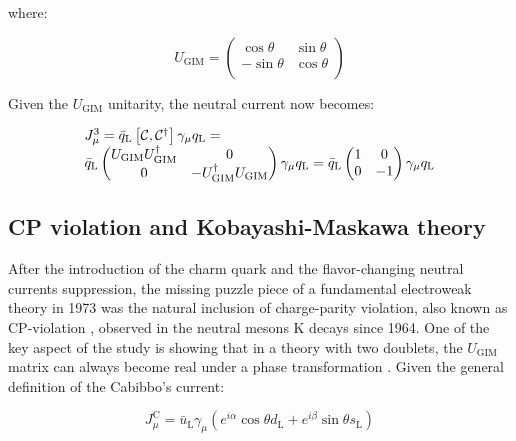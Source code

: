 where:

\begin{equation}
U_{\text{GIM}} =
\begin{pmatrix}
\cos\theta &\sin\theta \\
-\sin\theta &\cos\theta \\
\end{pmatrix}
\end{equation}

Given the $U_{\text{GIM}}$ unitarity, the neutral current now becomes:

\begin{equation}
	\begin{array}{l c l}
		J^{3}_{\mu} = \bar{q}_{\text{L}}\left[\mathcal{C}, \mathcal{C}^{\dagger} \right]\gamma_{\mu}q_{\text{L}} = \\
		\bar{q}_{\text{L}}
		\begin{pmatrix}
			U_{\text{GIM}}U_{\text{GIM}}^{\dagger} &0 \\
			0 &-U_{\text{GIM}}^{\dagger}U_{\text{GIM}} \\
		\end{pmatrix}
		\gamma_{\mu}q_{\text{L}} = \bar{q}_{\text{L}}
		\begin{pmatrix}
			1 &0 \\
			0 &-1 \\
		\end{pmatrix}
		\gamma_{\mu}q_{\text{L}}
	\end{array}
\end{equation}

\subsection{CP violation and Kobayashi-Maskawa theory}

After the introduction of the charm quark and the flavor-changing neutral currents suppression, the missing puzzle piece of a fundamental electroweak theory in 1973 was the natural inclusion of charge-parity violation, also known as CP-violation \cite{PTP.49.652}, observed in the neutral mesons K decays since 1964. 
One of the key aspect of the study is showing that in a theory with two doublets, the $U_{\text{GIM}}$ matrix can always become real under a phase transformation \cite{Glashow:1970gm}. Given the general definition of the Cabibbo's current:

\begin{equation}
J^{\text{C}}_{\mu} = \bar{u}_{\text{L}}\gamma_{\mu}\left( e^{i\alpha} \cos\theta d_{\text{L}} + e^{i\beta}\sin\theta s_{\text{L}}   \right)
\end{equation}


